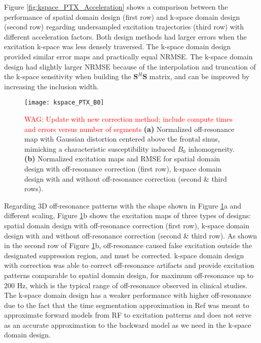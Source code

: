 Figure \ref{fig:kspace_PTX_Acceleration} shows a comparison between the performance of spatial domain design (first row) and k-space domain design (second row) regarding undersampled excitation trajectories (third row) with different acceleration factors. Both design methods had larger errors when the excitation k-space was less densely traversed. The k-space domain design provided similar error maps and practically equal NRMSE. The k-space domain design had slightly larger NRMSE because of the interpolation and truncation of the k-space sensitivity when building the $\mathbf{S}^{H}\mathbf{S}$ matrix, and can be improved by increasing the inclusion width. 


\begin{figure}
	\centering
	\texttt{[image: kspace\_PTX\_B0]}
	\caption{\textcolor{red}{WAG: Update with new correction method; include compute times and errors versus number of segments}
	\textbf{(a)} Normalized off-resonance map with Gaussian distortion centered above the frontal sinus, mimicking a characteristic susceptibility induced $B_0$ inhomogeneity. \textbf{(b)} Normalized excitation maps and RMSE for spatial domain design with off-resonance correction (first row), k-space domain design with and without off-resonance correction (second \& third rows).}
	\label{fig:kspace_PTX_B0}
\end{figure}

Regarding 3D off-resonance patterns with the shape shown in Figure \ref{fig:kspace_PTX_B0}a and different scaling, Figure \ref{fig:kspace_PTX_B0}b shows the excitation maps of three types of designs: spatial domain design with off-resonance correction (first row), k-space domain design with and without off-resonance correction (second \& third row). As shown in the second row of Figure \ref{fig:kspace_PTX_B0}b, off-resonance caused false excitation outside the designated suppression region, and must be corrected. k-space domain design with correction was able to correct off-resonance artifacts and provide excitation patterns comparable to spatial domain design, for maximum off-resonance up to 200 Hz, which is the typical range of off-resonance observed in clinical studies. The k-space domain design has a weaker performance with higher off-resonance due to the fact that the time segmentation approximation in Ref \cite{fessler2005toeplitz} was meant to approximate forward models from RF to excitation patterns and does not serve as an accurate approximation to the backward model as we need in the k-space domain design.